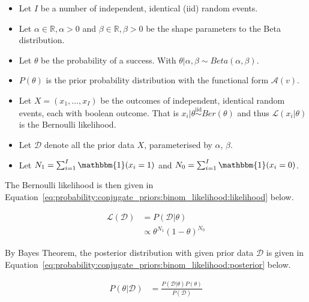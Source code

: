 \begin{itemize}
      \item Let $I$ be a number of independent, identical  (iid) random events.

      \item Let $\alpha \in \mathbb{R}, \alpha > 0$ and $\beta \in \mathbb{R}, \beta >0$ be the shape parameters to the Beta distribution.

      \item Let $\theta$ be the probability of a success. With $\theta | \alpha, \beta \sim Beta(\alpha, \beta)$.

      \item $P(\theta)$ is the prior probability distribution with the functional form $\mathcal{A}(v)$.

      \item Let $X = (x_{1}, \dots, x_{I})$ be the outcomes of independent, identical random events, each with boolean outcome. That is $x_{i} | \theta \overset{\text{iid}}{\sim} Ber(\theta)$ and thus $\mathcal{L}(x_{i} \vert \theta)$ is the Bernoulli likelihood.

      \item Let $\mathcal{D}$ denote all the prior data $X$, parameterised by $\alpha$, $\beta$.

      \item Let $N_{1} = \sum_{i=1}^{I} \mathbbm{1}(x_{i} = 1)$ and $N_{0} = \sum_{i=1}^{I} \mathbbm{1}(x_{i} = 0)$.
\end{itemize}

The Bernoulli likelihood is then given in Equation~\eqref{eq:probability:conjugate_priors:binom_likelihood:likelihood} below.

\begin{equation}
      \label{eq:probability:conjugate_priors:binom_likelihood:likelihood}
      \begin{split}
            \mathcal{L}(\mathcal{D}) &=  P(\mathcal{D} | \theta) \\
            &\propto \theta^{N_{1}}(1-\theta)^{N_{0}}
      \end{split}
\end{equation}

By Bayes Theorem, the posterior distribution with given prior data $\mathcal{D}$ is given in Equation~\eqref{eq:probability:conjugate_priors:binom_likelihood:posterior} below.

\begin{equation}
      \begin{split}
            \label{eq:probability:conjugate_priors:binom_likelihood:posterior}
            P(\theta \vert \mathcal{D}) &= \frac{P(\mathcal{D} | \theta) P(\theta)}{P(\mathcal{D})}
      \end{split}
\end{equation}

